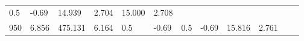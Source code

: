 \documentclass{article}
\begin{document}
\begin{longtable}[]{@{}llllllllllll@{}}
\begin{minipage}[t]{0.03\columnwidth}
0.5\strut
\end{minipage} & \begin{minipage}[t]{0.06\columnwidth}\raggedright\strut
-0.69\strut
\end{minipage} & \begin{minipage}[t]{0.06\columnwidth}\raggedright\strut
14.939\strut
\end{minipage} & \begin{minipage}[t]{0.08\columnwidth}\raggedright\strut
2.704\strut
\end{minipage} & \begin{minipage}[t]{0.06\columnwidth}\raggedright\strut
15.000\strut
\end{minipage} & \begin{minipage}[t]{0.09\columnwidth}\raggedright\strut
2.708\strut
\end{minipage}\tabularnewline
\begin{minipage}[t]{0.03\columnwidth}\raggedright\strut
950\strut
\end{minipage} & \begin{minipage}[t]{0.06\columnwidth}\raggedright\strut
6.856\strut
\end{minipage} & \begin{minipage}[t]{0.06\columnwidth}\raggedright\strut
475.131\strut
\end{minipage} & \begin{minipage}[t]{0.08\columnwidth}\raggedright\strut
6.164\strut
\end{minipage} & \begin{minipage}[t]{0.03\columnwidth}\raggedright\strut
0.5\strut
\end{minipage} & \begin{minipage}[t]{0.06\columnwidth}\raggedright\strut
-0.69\strut
\end{minipage} & \begin{minipage}[t]{0.03\columnwidth}\raggedright\strut
0.5\strut
\end{minipage} & \begin{minipage}[t]{0.06\columnwidth}\raggedright\strut
-0.69\strut
\end{minipage} & \begin{minipage}[t]{0.06\columnwidth}\raggedright\strut
15.816\strut
\end{minipage} & \begin{minipage}[t]{0.08\columnwidth}\raggedright\strut
2.761\strut
\end{minipage} & \begin{minipage}[t]{0.06\columnwidth}\raggedright\strut

\end{minipage}
\end{longtable}
\end{document}
